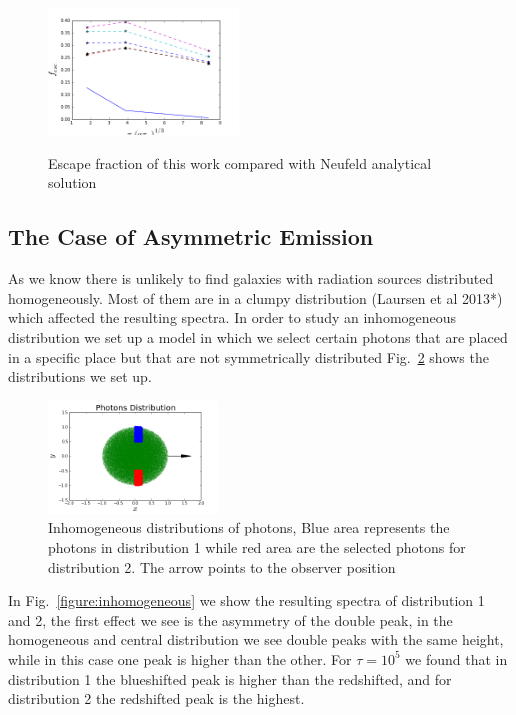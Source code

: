 \documentclass[usenatbib]{mn2e}
\begin{document}
\begin{figure}
  \includegraphics[width=0.45\textwidth]{Neufeld.png}
 \label{figure:efvsNeufeld}\caption{Escape fraction of this work
   compared with Neufeld analytical solution}  
\end{figure}

\subsection{The Case of Asymmetric Emission}

As we know there is unlikely to find galaxies with radiation sources 
distributed homogeneously. Most of them are in a clumpy distribution 
(Laursen et al 2013*) which affected the resulting spectra. In order 
to study an inhomogeneous distribution we set up a model in which we 
select certain photons that are placed in a specific place but that 
are not symmetrically distributed Fig.~\ref{figure:distributions} shows
the distributions we set up. 

\begin{figure}
  \includegraphics[width=0.40\textwidth]{Distribution.png}
  \caption{Inhomogeneous distributions of 
 photons, Blue area represents the photons in distribution 1 while red
 area are the selected photons for distribution 2. The arrow points to
 the observer position\label{figure:distributions}}  
\end{figure}

In Fig.~\ref{figure:inhomogeneous} we show the resulting spectra of 
distribution 1 and 2, the first effect we see is the asymmetry of the
double peak, in the homogeneous and central distribution we see double
peaks with the same height, while in this case one peak is higher than 
the other. For $\tau=10^{5}$ we found that in distribution 1 the blueshifted
peak is higher than the redshifted, and for distribution 2 the redshifted
peak is the highest.
\end{document}
